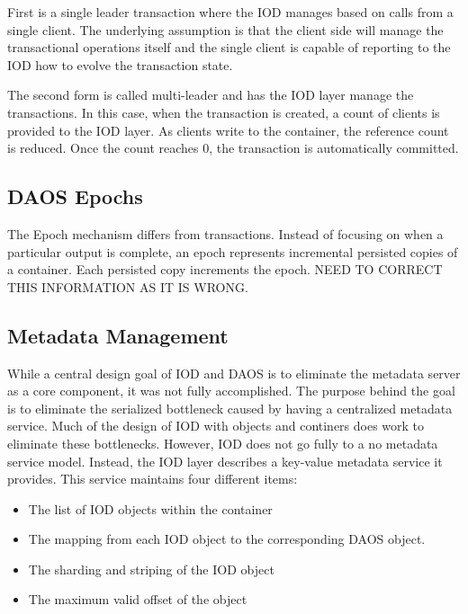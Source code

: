 \documentclass[conference]{sig-alt-gov2}
\begin{document}
First is a single leader transaction where the IOD manages based on calls from
a single client. The underlying assumption is that the client side will manage
the transactional operations itself and the single client is capable of
reporting to the IOD how to evolve the transaction state. 

The second form is called multi-leader and has the IOD layer manage the
transactions. In this case, when the transaction is created, a count of clients
is provided to the IOD layer. As clients write to the container, the reference
count is reduced. Once the count reaches 0, the transaction is automatically
committed.

\subsection{DAOS Epochs}
The Epoch mechanism differs from transactions. Instead of focusing on when a
particular output is complete, an epoch represents incremental persisted copies
of a container. Each persisted copy increments the epoch. NEED TO CORRECT
THIS INFORMATION AS IT IS WRONG.

\subsection{Metadata Management}
While a central design goal of IOD and DAOS is to eliminate the metadata server
as a core component, it was not fully accomplished.  The purpose behind the goal
is to eliminate the serialized bottleneck caused by having a centralized
metadata service. Much of the design of IOD with objects and continers does
work to eliminate these bottlenecks. However, IOD does not go fully to a no
metadata service model. Instead, the IOD layer describes a key-value metadata
service it provides. This service maintains four different items:

\begin{itemize}
\item The list of IOD objects within the container
\item The mapping from each IOD object to the corresponding DAOS object.
\item The sharding and striping of the IOD object
\item The maximum valid offset of the object
\end{itemize}
\end{document}
